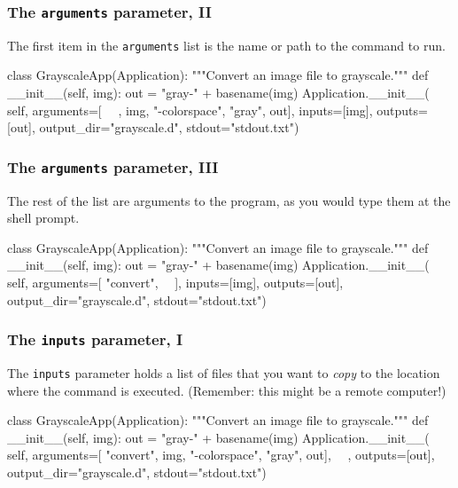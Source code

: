 \documentclass[english,serif,mathserif,xcolor=pdftex,dvipsnames,table]{beamer}
\begin{document}
\begin{frame}[fragile]
\frametitle{The \texttt{arguments} parameter, II}

The first item in the \texttt{arguments} list is the name or path to the command to run.

  \+
\begin{python}
class GrayscaleApp(Application):
  """Convert an image file to grayscale."""
  def __init__(self, img):
    out = "gray-" + basename(img)
    Application.__init__(
      self,
      arguments=[
        ~~, img, "-colorspace", "gray", out],
      inputs=[img],
      outputs=[out],
      output_dir="grayscale.d",
      stdout="stdout.txt")
\end{python}
\end{frame}

\begin{frame}[fragile]
\frametitle{The \texttt{arguments} parameter, III}

The rest of the list are arguments to the program, as you would type
them at the shell prompt.

  \+
\begin{python}
class GrayscaleApp(Application):
  """Convert an image file to grayscale."""
  def __init__(self, img):
    out = "gray-" + basename(img)
    Application.__init__(
      self,
      arguments=[
        "convert", ~~],
      inputs=[img],
      outputs=[out],
      output_dir="grayscale.d",
      stdout="stdout.txt")
\end{python}
\end{frame}


\begin{frame}[fragile]
\frametitle{The \texttt{inputs} parameter, I}

The \texttt{inputs} parameter holds a list of files that you want to
\emph{copy} to the location where the command is executed. (Remember:
this might be a remote computer!)

  \+
\begin{python}
class GrayscaleApp(Application):
  """Convert an image file to grayscale."""
  def __init__(self, img):
    out = "gray-" + basename(img)
    Application.__init__(
      self,
      arguments=[
        "convert", img, "-colorspace", "gray", out],
      ~~,
      outputs=[out],
      output_dir="grayscale.d",
      stdout="stdout.txt")
\end{python}
\end{frame}
\end{document}
